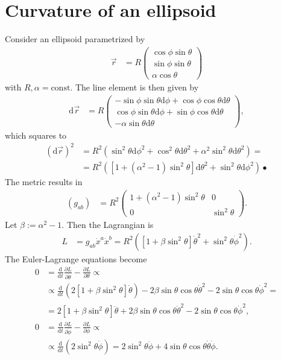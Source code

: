 \documentclass[english, parskip=full]{scrartcl}
\newcommand{\kla}{}
\newcommand{\klam}{}
\newcommand{\tecxt}{}
\begin{document}
\section{Curvature of an ellipsoid}
Consider an ellipsoid parametrized by 
\begin{align}
\vec{r} &= R\begin{pmatrix}
\cos\phi\sin\theta \\ \sin\phi\sin\theta \\ \alpha\cos\theta
\end{pmatrix}
\end{align}
with $R,\alpha = \tecxt\text{const}$.
The line element is then given by
\begin{align}
\tecxt\text{d}\vec{r} &= R\begin{pmatrix}
-\sin\phi\sin\theta \tecxt\text{d}\phi + \cos\phi\cos\theta \tecxt\text{d}\theta \\ 
\cos\phi\sin\theta \tecxt\text{d}\phi + \sin\phi\cos\theta \tecxt\text{d}\theta \\
-\alpha \sin\theta \tecxt\text{d}\theta
\end{pmatrix},
\end{align}
which squares to 
\begin{align}
(\tecxt\text{d}\vec{r})^2 &= R^2 \kla\left( \sin^2\theta \tecxt\text{d}\phi^2 + \cos^2\theta \tecxt\text{d}\theta^2 + \alpha^2\sin^2\theta \tecxt\text{d}\theta^2 \right) = \\
&= R^2 \kla\left( \klam\left[ 1  + (\alpha^2 - 1)\sin^2\theta \right] \tecxt\text{d}\theta^2 + \sin^2\theta \tecxt\text{d}\phi^2 \right)•
\end{align}
The metric results in
\begin{align}
(g_{ab}) &= R^2 \begin{pmatrix}
1 + (\alpha^2 - 1)\sin^2\theta & 0 \\ 0 & \sin^2\theta
\end{pmatrix}.
\end{align}
Let $\beta := \alpha^2 - 1$.
Then the Lagrangian is
\begin{align}
L &= g_{ab} \dot{x}^a \dot{x}^b = R^2 \kla\left( [1 + \beta \sin^2\theta] \dot{\theta}^2 + \sin^2\theta\dot{\phi}^2 \right).
\end{align}
The Euler-Lagrange equations become
\begin{align}
0 &= \frac{\tecxt\text{d}}{\tecxt\text{d}t} \frac{\partial L }{\partial \dot{\theta}} - \frac{\partial L}{\partial \theta} \propto \\
&\propto \frac{\tecxt\text{d}}{\tecxt\text{d}t} \kla\left( 2[1 + \beta \sin^2\theta] \dot{\theta} \right) - 2\beta \sin\theta\cos\theta \dot{\theta}^2 - 2\sin\theta\cos\theta \dot{\phi}^2 = \\
&= 2[1 + \beta \sin^2\theta] \ddot{\theta} + 2\beta \sin\theta\cos\theta \dot{\theta}^2 - 2\sin\theta\cos\theta \dot{\phi}^2,\\
0 &= \frac{\tecxt\text{d}}{\tecxt\text{d}t} \frac{\partial L }{\partial \dot{\phi}} - \frac{\partial L}{\partial \phi} \propto \\
&\propto \frac{\tecxt\text{d}}{\tecxt\text{d}t} \kla\left( 2\sin^2\theta \dot{\phi} \right) = 2\sin^2\theta \ddot{\phi} + 4\sin\theta \cos\theta \dot{\theta} \dot{\phi}.
\end{align}
\end{document}
